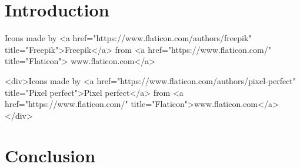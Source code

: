 \documentclass[twoside,bibtotoc,BCOR=9mm]{scrreprt}
\begin{document}
\chapter{Introduction}

Icons made by <a href="https://www.flaticon.com/authors/freepik" title="Freepik">Freepik</a> from <a href="https://www.flaticon.com/" title="Flaticon"> www.flaticon.com</a>

<div>Icons made by <a href="https://www.flaticon.com/authors/pixel-perfect" title="Pixel perfect">Pixel perfect</a> from <a href="https://www.flaticon.com/" title="Flaticon">www.flaticon.com</a></div>






\chapter{Conclusion}
\label{ch-outro}




%
\end{document}
